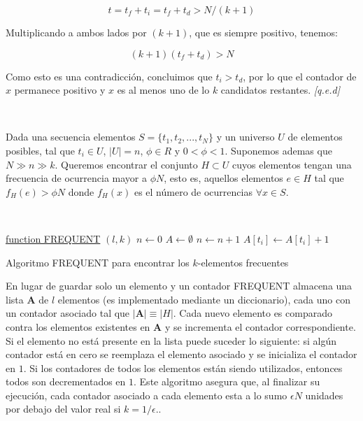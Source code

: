 \documentclass[a4paper,12pt, oneside]{article}
\begin{document}
\begin{equation*}
	t = t_f + t_i = t_f + t_d > N/(k+1)
\end{equation*}


Multiplicando a ambos lados por $(k+1)$, que es siempre positivo, tenemos:

\begin{equation*}
	(k+1)(t_f + t_d) > N
\end{equation*}

Como esto es una contradicción, concluimos que $t_i > t_d$, por lo que el contador de $x$ permanece positivo y $x$ es al menos uno de lo $k$ candidatos restantes. \textit{[q.e.d]}

\

Dada una secuencia elementos $S = \{t_1, t_2, ..., t_N\}$ y un universo $U$ de elementos posibles, tal que $t_i \in U$, $|U| = n$, $\phi \in R$ y $0 < \phi < 1$. Suponemos ademas que $N \gg n \gg k$. Queremos encontrar el conjunto $H \subset U$ cuyos elementos tengan una frecuencia de ocurrencia mayor a $\phi N$, esto es, aquellos elementos $e \in H$ tal que $f_H(e) > \phi N$ donde $f_H(x)$ es el número de ocurrencias $\forall x \in S$.

\

\begin{algorithm}
	
	\underline{function FREQUENT} $(l, k)$\;
	$n \leftarrow 0$\;
	$A \leftarrow \emptyset$\;
	{
		$n \leftarrow n + 1$\;
		{
			$A[t_i] \leftarrow A[t_i] + 1$\;
		}{
		}
	}
	\caption{Algoritmo FREQUENT para encontrar los $k$-elementos frecuentes}
	\label{alg:frequent}
\end{algorithm}

En lugar de guardar solo un elemento y un contador FREQUENT almacena una lista $\mathbf{A}$ de $l$ elementos (es implementado mediante un diccionario), cada uno con un contador asociado tal que $|\mathbf{A}| \equiv |H|$. Cada nuevo elemento es comparado contra los elementos existentes en $\mathbf{A}$ y se incrementa el contador correspondiente. Si el elemento no está presente en la lista puede suceder lo siguiente: si algún contador está en cero se reemplaza el elemento asociado y se inicializa el contador en $1$. Si los contadores de todos los elementos están siendo utilizados, entonces todos son decrementados en $1$. Este algoritmo asegura que, al finalizar su ejecución, cada contador asociado a cada elemento esta a lo sumo $\epsilon N$ unidades por debajo del valor real si $k = 1/ \epsilon$.\cite{Kranakis03boundsfor}.
\end{document}
